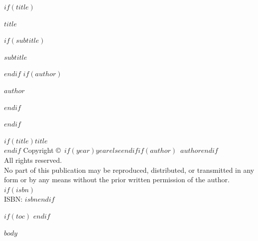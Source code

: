 \documentclass[%
  $if(fontsize)$$fontsize$$else$11pt$endif$,%
  $if(open-right)$openright$else$openany$endif$,%
  twoside%
]{book}
\begin{document}
\frontmatter
\pagestyle{empty}

$if(title)$
\begin{titlepage}
  \centering
  {\Huge\bfseries $title$\par}
  $if(subtitle)$
  \vspace{0.5in}
  {\Large\itshape $subtitle$\par}
  $endif$
  \vspace{1in}
  $if(author)$
  {\large $author$\par}
  $endif$
\end{titlepage}
$endif$

\clearpage
\vspace*{\fill}
\begin{center}
\small
$if(title)$\textit{$title$}\\[0.5em]$endif$
Copyright \copyright\ $if(year)$$year$$else$\the\year$endif$$if(author)$\ $author$$endif$\\[0.5em]
All rights reserved.\\[0.5em]
No part of this publication may be reproduced, distributed, or transmitted in any form or by any means without the prior written permission of the author.
$if(isbn)$\\[0.5em]ISBN: $isbn$$endif$
\end{center}
\vspace*{\fill}
\clearpage

$if(toc)$
\pagestyle{plain}
\tableofcontents
\clearpage
$endif$

\mainmatter
\pagestyle{fancy}

$body$

\backmatter
\end{document}
